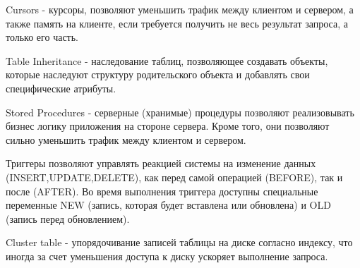 Cursors - курсоры, позволяют уменьшить трафик между клиентом и сервером, а также память на клиенте, если требуется получить не весь результат запроса, а только его часть.


Table Inheritance - наследование таблиц, позволяющее создавать объекты, которые наследуют структуру родительского объекта и добавлять свои специфические атрибуты.


Stored Procedures - серверные (хранимые) процедуры позволяют реализовывать бизнес логику приложения на стороне сервера. Кроме того, они позволяют сильно уменьшить трафик между клиентом и сервером.


Триггеры позволяют управлять реакцией системы на изменение данных (INSERT,UPDATE,DELETE), как перед самой операцией (BEFORE), так и после (AFTER). Во время выполнения триггера доступны специальные переменные NEW (запись, которая будет вставлена или обновлена) и OLD (запись перед обновлением).


Cluster table - упорядочивание записей таблицы на диске согласно индексу, что иногда за счет уменьшения доступа к диску ускоряет выполнение запроса.


